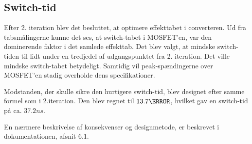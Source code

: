 
\subsection{Switch-tid}
Efter 2. iteration blev det besluttet, at optimere effekttabet i converteren. Ud fra tabsmålingerne kunne det ses, at switch-tabet i MOSFET'en, var den dominerende faktor i det samlede effekttab. Det blev valgt, at mindske switch-tiden til lidt under en tredjedel af udgangspunktet fra 2. iteration. Det ville mindske switch-tabet betydeligt. Samtidig vil peak-spændingerne over MOSFET'en stadig overholde dens specifikationer. 

Modstanden, der skulle sikre den hurtigere switch-tid, blev designet efter samme formel som i 2.iteration. Den blev regnet til $13.7\ohm$, hvilket gav en switch-tid på ca. $37.2ns$. 

En nærmere beskrivelse af konsekvenser og designmetode, er beskrevet i dokumentationen, afsnit 6.1.